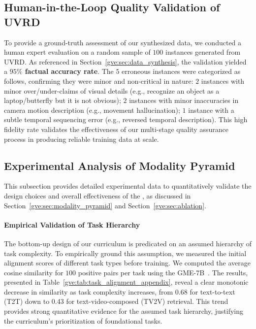 \fi

\iffalse %
\subsection{Human-in-the-Loop Quality Validation of UVRD}\label{gve:app:v-synflow_validation}

To provide a ground-truth assessment of our synthesized data, we conducted a human expert evaluation on a random sample of $100$ instances generated from UVRD. As referenced in Section~\ref{gve:sec:data_synthesis}, the validation yielded a \textbf{$95\%$ factual accuracy rate}. The $5$ erroneous instances were categorized as follows, confirming they were minor and non-critical in nature:
$2$ instances with minor over/under-claims of visual details (e.g., recognize an object as a laptop/butterfly but it is not obvious);
$2$ instances with minor inaccuracies in camera motion description (e.g., movement hallucination);
$1$ instance with a subtle temporal sequencing error (e.g., reversed temporal description).
This high fidelity rate validates the effectiveness of our multi-stage quality assurance process in producing reliable training data at scale.


\subsection{Experimental Analysis of Modality Pyramid}\label{gve:app:pyramid_validation}

This subsection provides detailed experimental data to quantitatively validate the design choices and overall effectiveness of the \pyramid, as discussed in Section~\ref{gve:sec:modality_pyramid} and Section~\ref{gve:sec:ablation}.

\paragraph{Empirical Validation of Task Hierarchy}
The bottom-up design of our curriculum is predicated on an assumed hierarchy of task complexity. To empirically ground this assumption, we measured the initial alignment scores of different task types before training. We computed the average cosine similarity for $100$ positive pairs per task using the GME-7B~\cite{Zhang_2025_CVPR}. The results, presented in Table~\ref{gve:tab:task_alignment_appendix}, reveal a clear monotonic decrease in similarity as task complexity increases, from 0.68 for text-to-text (T2T) down to 0.43 for text-video-composed (TV2V) retrieval. This trend provides strong quantitative evidence for the assumed task hierarchy, justifying the curriculum's prioritization of foundational tasks.

